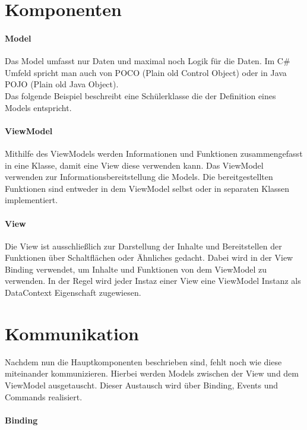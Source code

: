 \documentclass[titlepage=false,12pt]{scrreprt}
\begin{document}
\section{Komponenten}

\paragraph{Model}

Das Model umfasst nur Daten und maximal noch Logik für die Daten. 
Im C\# Umfeld spricht man auch von POCO (Plain old Control Object) 
oder in Java POJO (Plain old Java Object).
\\
Das folgende Beispiel beschreibt eine Schülerklasse die der Definition 
eines Models entspricht.



\paragraph{ViewModel}

Mithilfe des ViewModels werden Informationen und Funktionen zusammengefasst
in eine Klasse, damit eine View diese verwenden kann. Das ViewModel verwenden zur 
Informationsbereitstellung die Models. Die bereitgestellten Funktionen sind
entweder in dem ViewModel selbst oder in separaten Klassen implementiert.

\paragraph{View}

Die View ist ausschließlich zur Darstellung der Inhalte und Bereitstellen der
Funktionen über Schaltflächen oder Ähnliches gedacht. Dabei wird in der View
Binding verwendet, um Inhalte und Funktionen von dem ViewModel zu verwenden.
In der Regel wird jeder Instaz einer View eine ViewModel Instanz als DataContext
Eigenschaft zugewiesen.

\section{Kommunikation}

Nachdem nun die Hauptkomponenten beschrieben sind, fehlt noch wie diese miteinander 
kommunizieren. Hierbei werden Models zwischen der View und dem ViewModel ausgetauscht.
Dieser Austausch wird über Binding, Events und Commands realisiert.

\paragraph{Binding}
\end{document}
